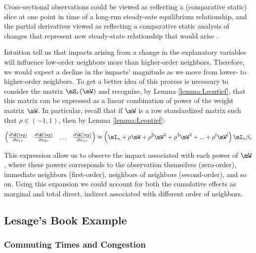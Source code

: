 \documentclass[english,12pt]{book}\usepackage[]{graphicx}\usepackage[]{xcolor}
\begin{document}
\begin{remark}
Cross-sectional observations could be viewed as reflecting a (comparative static) slice at one point in time of a long-run steady-sate equilibrium relationship, and the partial derivatives viewed as reflecting a comparative static analysis of changes that represent new steady-state relationship that would arise \citep{lesage2014regional}.
\end{remark}

Intuition tell us that impacts arising from a change in the explanatory variables will influence low-order neighbors more than higher-order neighbors. Therefore, we would expect a decline in the impacts' magnitude as we move from lower- to higher-order neighbors. To get a better idea of this process is necessary to consider the matrix $\mS_r(\mW)$ and recognize, by Lemma \ref{lemma:Leontief}, that this matrix can be expressed as a linear combination of power of the weight matrix $\mW$. In particular, recall that if $\mW$ is a row standardized matrix such that $\rho \in (-1, 1)$, then by Lemma \ref{lemma:Leontief}:

\begin{equation}
  \begin{pmatrix}
  \frac{\partial \E(\vy)}{\partial x_{1r}} & \frac{\partial \E(\vy)}{\partial x_{2r}} & \hdots & \frac{\partial \E(\vy)}{\partial x_{nr}} 
   \end{pmatrix} \approx \left(\mI_n  + \rho \mW + \rho^2\mW^2 + \rho^3\mW^3 + ... + \rho^l\mW^l\right)\mI_n\beta_r  
\end{equation}
    
This expression allow us to observe the impact associated with each power of $\mW$, where these powers corresponds to the observation themselves (zero-order), immediate neighbors (first-order), neighbors of neighbors (second-order), and so on. Using this expansion we could account for both the cumulative effects as marginal and total direct, indirect associated with different order of neighbors.

\subsection{Lesage's Book Example}\label{sec:lesage-example}

\subsubsection{Commuting Times and Congestion}
\end{document}
